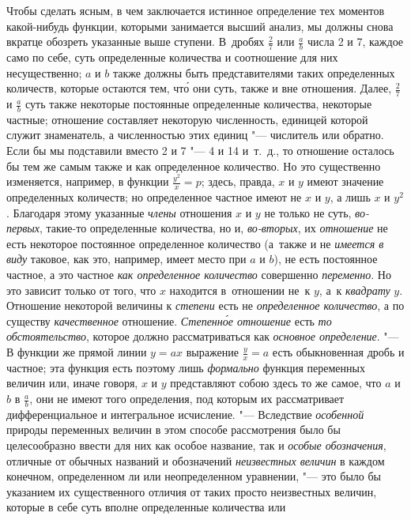 Чтобы сделать ясным, в чем заключается истинное определение тех моментов
какой-нибудь функции, которыми занимается высший анализ, мы должны снова
вкратце обозреть указанные выше ступени. В~дробях $\frac 2 7$ или $\frac a b$
числа 2 и 7, каждое само по себе, суть определенные количества и соотношение
для них несущественно; $a$ и $b$ также должны быть представителями таких
определенных количеств, которые остаются тем, чт\'{о} они суть, также и вне
отношения. Далее, $\frac 2 7$ и $\frac a b$ суть также некоторые постоянные
определенные количества, некоторые частные; отношение составляет некоторую
численность, единицей которой служит знаменатель, а численностью этих единиц
"--- числитель или обратно. Если бы мы подставили вместо 2 и 7 "--- 4 и 14
и~т.~д., то отношение осталось бы тем же самым также и как определенное
количество. Но это существенно изменяется, например, в функции
$\frac{y^2}x=p$; здесь, правда, $x$ и $y$ имеют значение определенных
количеств; но определенное частное имеют не $x$ и $y$, а лишь $x$ и $y^2$.
Благодаря этому указанные {\em члены} отношения $x$ и $y$ не только не суть,
{\em во-первых}, такие-то определенные количества, но и, {\em во-вторых}, их
{\em отношение} не есть некоторое постоянное определенное количество (а~также и
не {\em имеется в виду} таковое, как это, например, имеет место при $a$ и $b$),
не есть постоянное частное, а это частное {\em как определенное количество}
совершенно {\em переменно}. Но это зависит только от того, что $x$ находится
в~отношении не~к $y$, а~к {\em квадрату} $y$. Отношение некоторой величины
к {\em степени} есть не {\em определенное количество}, а по существу
{\em качественное} отношение. {\em Степенн\'{о}е отношение} есть {\em то
обстоятельство}, которое должно рассматриваться как {\em основное определение}.
"--- В функции же прямой линии $y=ax$ выражение $\frac y x=a$ есть обыкновенная
дробь и частное; эта функция есть поэтому лишь {\em формально} функция
переменных величин или, иначе говоря, $x$ и $y$ представляют собою здесь то же
самое, что $a$ и $b$ в $\frac a b$, они не имеют того определения, под которым
их рассматривает дифференциальное и интегральное исчисление. "--- Вследствие
{\em особенной} природы переменных величин в этом способе рассмотрения было бы
целесообразно ввести для них как особое название, так и
{\em особые обозначения}, отличные от обычных названий и обозначений
{\em неизвестных величин} в каждом конечном, определенном ли или неопределенном
уравнении, "--- это было бы указанием их существенного отличия от таких просто
неизвестных величин, которые в себе суть вполне определенные количества или
